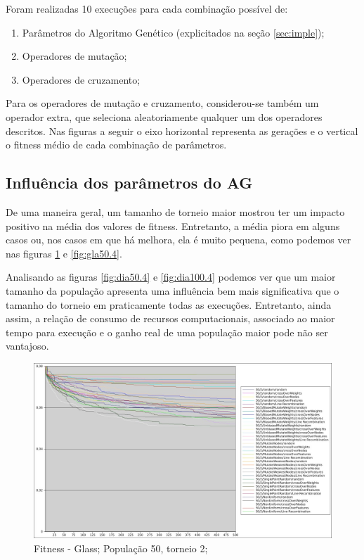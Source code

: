 \documentclass[12pt]{article}
\begin{document}
Foram realizadas 10 execuções para cada combinação possível de:
\begin{enumerate}
\item Parâmetros do Algoritmo Genético (explicitados na seção \ref{sec:imple});
\item Operadores de mutação;
\item Operadores de cruzamento;
\end{enumerate}

Para os operadores de mutação e cruzamento, considerou-se também um operador extra, que seleciona aleatoriamente qualquer um dos operadores descritos. Nas figuras a seguir o eixo horizontal representa as gerações e o vertical o fitness médio de cada combinação de parâmetros.

\subsection{Influência dos parâmetros do AG}\label{res:ag}

De uma maneira geral, um tamanho de torneio maior mostrou ter um impacto positivo na média dos valores de fitness. Entretanto, a média piora em alguns casos ou, nos casos em que há melhora, ela é muito pequena, como podemos ver nas figuras \ref{fig:gla50.2} e \ref{fig:gla50.4}.

Analisando as figuras \ref{fig:dia50.4} e \ref{fig:dia100.4} podemos ver que um maior tamanho da população apresenta uma influência bem mais significativa que o tamanho do torneio em praticamente todas as execuções. Entretanto, ainda assim, a relação de consumo de recursos computacionais, associado ao maior tempo para execução e o ganho real de uma população maior pode não ser vantajoso.

\begin{figure}[htp]
\center
\includegraphics[scale=0.4, keepaspectratio]{glass_50_2.jpg} 
\caption{Fitness - Glass; População 50, torneio 2;}
\label{fig:gla50.2}
\end{figure}
\end{document}
